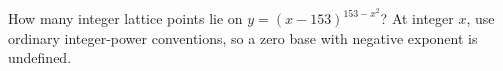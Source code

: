 How many integer lattice points lie on $y=(x-153)^{153-x^2}$? At integer $x$, use ordinary integer-power conventions, so a zero base with negative exponent is undefined.
